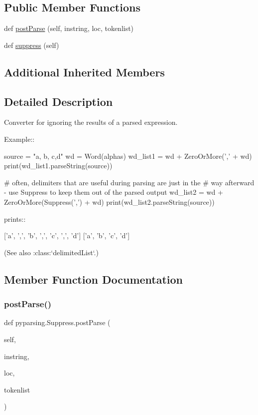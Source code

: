 \subsection*{Public Member Functions}
\begin{DoxyCompactItemize}
\item 
def \hyperlink{classpyparsing_1_1Suppress_a3623365e15025916e5beae7b7606770c}{post\+Parse} (self, instring, loc, tokenlist)
\item 
def \hyperlink{classpyparsing_1_1Suppress_a7c1cd39f8e2c641fb6d34a5fb8f6af2f}{suppress} (self)
\end{DoxyCompactItemize}
\subsection*{Additional Inherited Members}


\subsection{Detailed Description}
\begin{DoxyVerb}Converter for ignoring the results of a parsed expression.

Example::

    source = "a, b, c,d"
    wd = Word(alphas)
    wd_list1 = wd + ZeroOrMore(',' + wd)
    print(wd_list1.parseString(source))

    # often, delimiters that are useful during parsing are just in the
    # way afterward - use Suppress to keep them out of the parsed output
    wd_list2 = wd + ZeroOrMore(Suppress(',') + wd)
    print(wd_list2.parseString(source))

prints::

    ['a', ',', 'b', ',', 'c', ',', 'd']
    ['a', 'b', 'c', 'd']

(See also :class:`delimitedList`.)
\end{DoxyVerb}
 

\subsection{Member Function Documentation}
\mbox{\label{classpyparsing_1_1Suppress_a3623365e15025916e5beae7b7606770c}} 
\subsubsection{\texorpdfstring{post\+Parse()}{postParse()}}
{\footnotesize\ttfamily def pyparsing.\+Suppress.\+post\+Parse (\begin{DoxyParamCaption}\item[{}]{self,  }\item[{}]{instring,  }\item[{}]{loc,  }\item[{}]{tokenlist }\end{DoxyParamCaption})}

